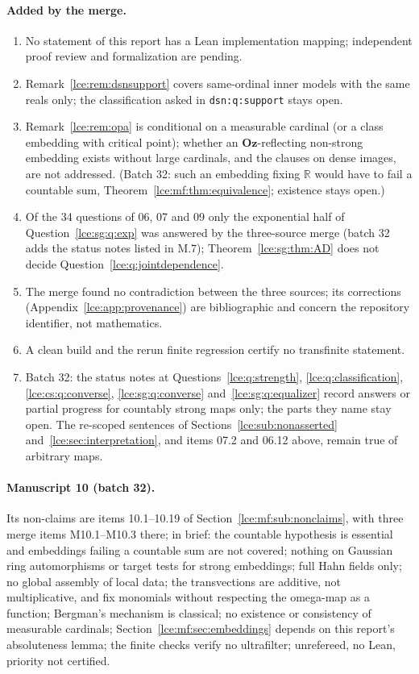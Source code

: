 \documentclass[11pt,letterpaper]{article}
\numberwithin{equation}{section}
\theoremstyle{definition}
\theoremstyle{remark}
\newcommand{\Oz}{\mathbf{Oz}}
\newcommand{\R}{\mathbb R}
\newcommand{\thref}[1]{Theorem~\ref{#1}}
\newcommand{\lbl}[1]{\nolinkurl{#1}}%
\begin{document}
\paragraph{Added by the merge.}
\begin{enumerate}[label=M.\arabic*]
\item No statement of this report has a Lean implementation mapping;
independent proof review and formalization are pending.
\item Remark~\ref{lce:rem:dsnsupport} covers same-ordinal inner models with
the same reals only; the classification asked in \lbl{dsn:q:support} stays
open.
\item Remark~\ref{lce:rem:opa} is conditional on a measurable cardinal (or a
class embedding with critical point); whether an $\Oz$-reflecting non-strong
embedding exists without large cardinals, and the clauses on dense images,
are not addressed. (Batch 32: such an embedding fixing $\R$ would have to
fail a countable sum, \thref{lce:mf:thm:equivalence}; existence stays
open.)
\item Of the 34 questions of 06, 07 and 09 only the exponential half of
Question~\ref{lce:sg:q:exp} was answered by the three-source merge (batch 32
adds the status notes listed in M.7);
\thref{lce:sg:thm:AD} does not decide Question~\ref{lce:q:jointdependence}.
\item The merge found no contradiction between the three sources; its
corrections (Appendix~\ref{lce:app:provenance}) are bibliographic and
concern the repository identifier, not mathematics.
\item A clean build and the rerun finite regression certify no
transfinite statement.
\item Batch 32: the status notes at Questions~\ref{lce:q:strength},
\ref{lce:q:classification}, \ref{lce:cs:q:converse},
\ref{lce:sg:q:converse} and~\ref{lce:sg:q:equalizer} record answers or
partial progress for countably strong maps only; the parts they name stay
open. The re-scoped sentences of Sections~\ref{lce:sub:nonasserted}
and~\ref{lce:sec:interpretation}, and items 07.2 and 06.12 above, remain
true of arbitrary maps.
\end{enumerate}

\paragraph{Manuscript 10 (batch 32).} Its non-claims are items 10.1--10.19
of Section~\ref{lce:mf:sub:nonclaims}, with three merge items M10.1--M10.3
there; in brief: the countable hypothesis is essential and embeddings
failing a countable sum are not covered; nothing on Gaussian ring
automorphisms or target tests for strong embeddings; full Hahn fields only;
no global assembly of local data; the transvections are additive, not
multiplicative, and fix monomials without respecting the omega-map as a
function; Bergman's mechanism is classical; no existence or consistency of
measurable cardinals; Section~\ref{lce:mf:sec:embeddings} depends on this
report's absoluteness lemma; the finite checks verify no ultrafilter;
unrefereed, no Lean, priority not certified.
\end{document}
